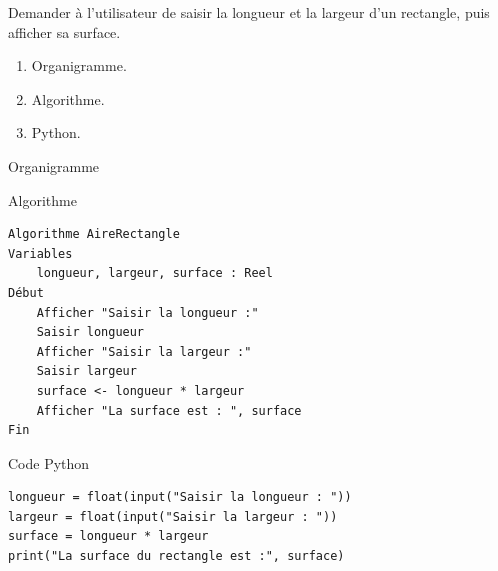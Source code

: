 \documentclass[12pt,a4paper]{article}
\begin{document}
\begin{exobox}[title=\textbf{Exercice 6 — Aire du rectangle}]
Demander à l’utilisateur de saisir la longueur et la largeur d’un rectangle, puis afficher sa surface.
\end{exobox}

\begin{taskbox}
\begin{enumerate}
  \item Organigramme.
  \item Algorithme.
  \item Python.
\end{enumerate}
\end{taskbox}

\begin{ansbox}{Organigramme}
\end{ansbox}

\begin{ansbox}{Algorithme}
\begin{verbatim}
Algorithme AireRectangle
Variables
    longueur, largeur, surface : Reel
Début
    Afficher "Saisir la longueur :"
    Saisir longueur
    Afficher "Saisir la largeur :"
    Saisir largeur
    surface <- longueur * largeur
    Afficher "La surface est : ", surface
Fin
\end{verbatim}
\end{ansbox}

\begin{ansbox}{Code Python}
\begin{verbatim}
longueur = float(input("Saisir la longueur : "))
largeur = float(input("Saisir la largeur : "))
surface = longueur * largeur
print("La surface du rectangle est :", surface)
\end{verbatim}
\end{ansbox}
\end{document}
